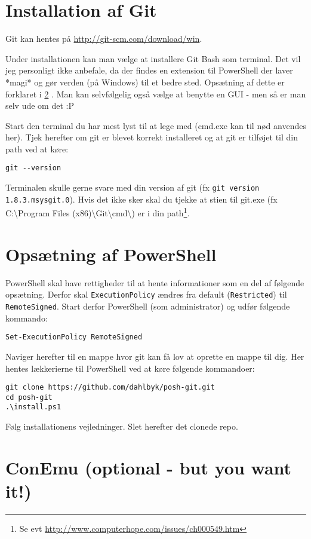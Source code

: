\section{Installation af Git}
Git kan hentes på \url{http://git-scm.com/download/win}.

Under installationen kan man vælge at installere Git Bash som terminal.
Det vil jeg personligt ikke anbefale, da der findes en extension til PowerShell der laver *magi* og gør verden (på Windows) til et bedre sted.
Opsætning af dette er forklaret i \ref{gitguide:powershell} .
Man kan selvfølgelig også vælge at benytte en GUI - men så er man selv ude om det :P

Start den terminal du har mest lyst til at lege med (cmd.exe kan til nød anvendes her).
Tjek herefter om git er blevet korrekt installeret og at git er tilføjet til din path ved at køre:
\begin{lstlisting}
git --version
\end{lstlisting}
Terminalen skulle gerne svare med din version af git (fx \texttt{git version 1.8.3.msysgit.0}).
Hvis det ikke sker skal du tjekke at stien til git.exe (fx C:\textbackslash{}Program Files (x86)\textbackslash{}Git\textbackslash{}cmd\textbackslash{}) er i din path\footnote{Se evt \url{http://www.computerhope.com/issues/ch000549.htm}}.

\section{Opsætning af PowerShell}\label{gitguide:powershell}

PowerShell skal have rettigheder til at hente informationer som en del af følgende opsætning.
Derfor skal \texttt{ExecutionPolicy} ændres fra default (\texttt{Restricted}) til \texttt{RemoteSigned}.
Start derfor PowerShell (som administrator) og udfør følgende kommando:
\begin{lstlisting}
Set-ExecutionPolicy RemoteSigned
\end{lstlisting}

Naviger herefter til en mappe hvor git kan få lov at oprette en mappe til dig.
Her hentes lækkerierne til PowerShell ved at køre følgende kommandoer:
\begin{lstlisting}
git clone https://github.com/dahlbyk/posh-git.git
cd posh-git
.\install.ps1
\end{lstlisting}
Følg installationens vejledninger.
Slet herefter det clonede repo.

\section{ConEmu (optional - but you want it!)}

